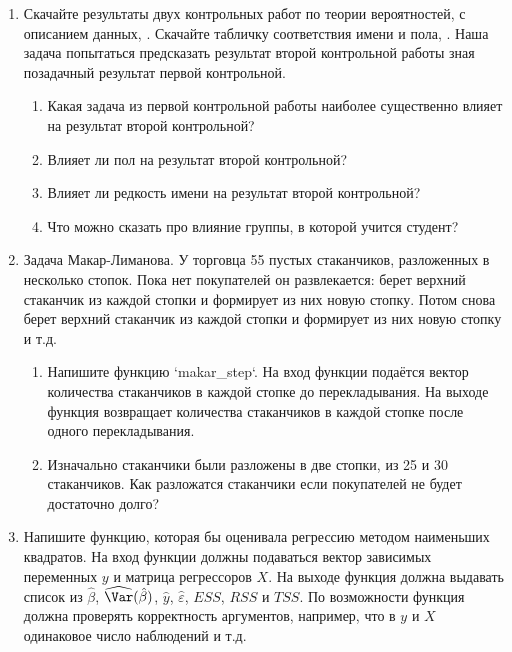 \documentclass[pdftex,12pt,a4paper]{article}
\def \hb{\hat{\beta}}
\def \hy{\hat{y}}
\def \he{\hat{\varepsilon}}
\def \hVar{\widehat{\Var}}
\newcommand{\solution}[1]{}
\begin{document}
\begin{enumerate}


\item Скачайте результаты двух контрольных работ по теории вероятностей, \url{} с описанием данных, \url{}. Скачайте табличку соответствия имени и пола, \url{}. Наша задача попытаться предсказать результат второй контрольной работы зная позадачный результат первой контрольной. 
\begin{enumerate}
\item Какая задача из первой контрольной работы наиболее существенно влияет на результат второй контрольной?
\item Влияет ли пол на результат второй контрольной?
\item Влияет ли редкость имени на результат второй контрольной?
\item Что можно сказать про влияние группы, в которой учится студент?
\end{enumerate}
\solution{}

\item Задача Макар-Лиманова. У торговца 55 пустых стаканчиков, разложенных в несколько стопок. Пока нет покупателей он развлекается: берет верхний стаканчик из каждой стопки и формирует из них новую стопку. Потом снова берет верхний стаканчик из каждой стопки и формирует из них новую стопку и т.д.
\begin{enumerate}
\item Напишите функцию `makar\_step`. На вход функции подаётся вектор количества стаканчиков в каждой стопке до перекладывания. На выходе функция возвращает количества стаканчиков в каждой стопке после одного перекладывания.
\item Изначально стаканчики были разложены в две стопки, из 25 и 30 стаканчиков. Как разложатся стаканчики если покупателей не будет достаточно долго?
\end{enumerate}
\solution{}

\item Напишите функцию, которая бы оценивала регрессию методом наименьших квадратов. На вход функции должны подаваться вектор зависимых переменных $y$ и матрица регрессоров $X$. На выходе функция должна выдавать список из $\hb$, $\hVar(\hb)$, $\hy$, $\he$, $ESS$, $RSS$ и $TSS$. По возможности функция должна проверять корректность аргументов, например, что в $y$ и $X$ одинаковое число наблюдений и т.д.
\solution{}


\end{enumerate}
\end{document}
